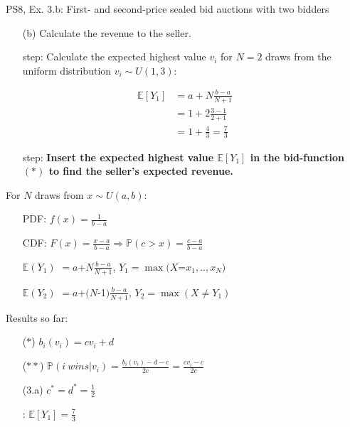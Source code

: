 \begin{frame}{PS8, Ex. 3.b: First- and second-price sealed bid auctions with two bidders}
    \begin{multicols}{2}
      \begin{itemize}
        \item[(b)] Calculate the revenue to the seller.
        \item[\nth{1} step:] Calculate the expected highest value $v_i$ for $N=2$ draws from the uniform distribution $v_i\sim U(1,3)$:
      \end{itemize}
      \vspace{-8pt}
      \begin{align*}
        \mathbb{E}[Y_1]&=a+N\frac{b-a}{N+1}\\
                       &=1+2\frac{3-1}{2+1}\\
                       &=1+\frac{4}{3}=\frac{7}{3}
      \end{align*}
      \vspace{-12pt}
      \begin{itemize}
        \item[\nth{2} step:] \textbf{Insert the expected highest value $\mathbb{E}[Y_1]$ in the bid-function $(*)$  to find the seller's expected revenue.}
      \end{itemize}
      \vfill\null\columnbreak
      For $N$ draws from $x\sim U(a, b):$
      \vspace{-6pt}
      \begin{enumerate}
        \item[PDF:] $f(x)=\frac{1}{b-a}$
        \item[CDF:] $F(x)=\frac{x-a}{b-a}\Rightarrow\mathbb{P}(c>x)=\frac{c-a}{b-a}$
        \item[$\mathbb{E}(Y_1)$] $=a$+$N\frac{b-a}{N+1}$, $Y_1=\max(X$=$x_1,..,x_N)$
        \item[$\mathbb{E}(Y_2)$] $=a$+$(N$-1$)\frac{b-a}{N+1}$, $Y_2=\max(X\neq Y_1)$
      \end{enumerate}
      \vspace{-6pt}
      Results so far:
      \vspace{-6pt}
      \begin{itemize}
        \item[($*$)]  $b_i(v_i) = cv_i+d$
        \item[($**$)] $\mathbb{P}(i\ wins|v_i)=\frac{b_i(v_i)-d-c}{2c}=\frac{cv_i-c}{2c}$
        \item[(3.a)]    $c^*=d^*=\frac{1}{2}$
        \item[\nth{1}:] $\mathbb{E}[Y_1]=\frac{7}{3}$
      \end{itemize}
      \vfill\null
    \end{multicols}
\end{frame}
